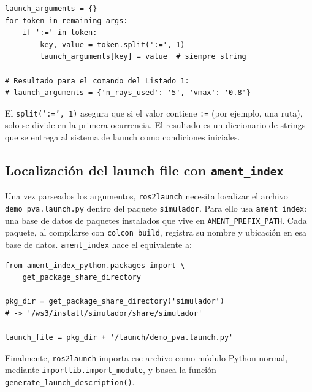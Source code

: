 \begin{lstlisting}[style=python, caption={Parsing de overrides de argumentos (simplificación del mecanismo interno).}]
launch_arguments = {}
for token in remaining_args:
    if ':=' in token:
        key, value = token.split(':=', 1)
        launch_arguments[key] = value  # siempre string

# Resultado para el comando del Listado 1:
# launch_arguments = {'n_rays_used': '5', 'vmax': '0.8'}
\end{lstlisting}

El \texttt{split(':=', 1)} asegura que si el valor contiene \texttt{:=} (por ejemplo, una ruta), solo se divide en la primera ocurrencia. El resultado es un diccionario de strings que se entrega al sistema de launch como condiciones iniciales.

\subsection{Localización del launch file con \texttt{ament\_index}}

Una vez parseados los argumentos, \texttt{ros2launch} necesita localizar el archivo \texttt{demo\_pva.launch.py} dentro del paquete \texttt{simulador}. Para ello usa \texttt{ament\_index}: una base de datos de paquetes instalados que vive en \texttt{AMENT\_PREFIX\_PATH}. Cada paquete, al compilarse con \texttt{colcon build}, registra su nombre y ubicación en esa base de datos. \texttt{ament\_index} hace el equivalente a:

\begin{lstlisting}[style=python, caption={Localización del launch file (simplificado).}]
from ament_index_python.packages import \
    get_package_share_directory

pkg_dir = get_package_share_directory('simulador')
# -> '/ws3/install/simulador/share/simulador'

launch_file = pkg_dir + '/launch/demo_pva.launch.py'
\end{lstlisting}

Finalmente, \texttt{ros2launch} importa ese archivo como módulo Python normal, mediante \texttt{importlib.import\_module}, y busca la función \texttt{generate\_launch\_description()}.
